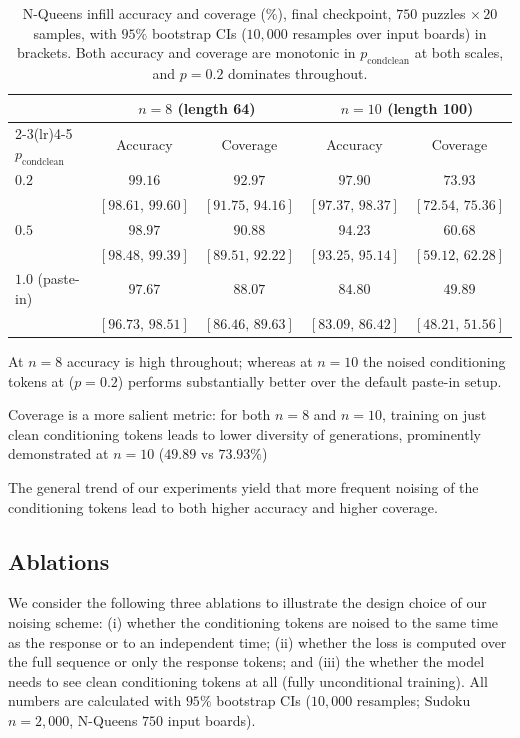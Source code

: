 \documentclass{article}
\begin{document}
\begin{table}[t]
\centering
\caption{N-Queens infill accuracy and coverage (\%), final checkpoint, $750$ puzzles
$\times\,20$ samples, with $95\%$ bootstrap CIs ($10{,}000$ resamples over input boards) in
brackets. Both accuracy and coverage are monotonic in $p_\text{condclean}$ at both scales, and
$p{=}0.2$ dominates throughout.}
\label{tab:nqueens}
\begin{tabular}{lcccc}
\toprule
& \multicolumn{2}{c}{$n=8$ (length 64)} & \multicolumn{2}{c}{$n=10$ (length 100)} \\
\cmidrule(lr){2-3}\cmidrule(lr){4-5}
$p_\text{condclean}$ & Accuracy & Coverage & Accuracy & Coverage \\
\midrule
$0.2$ & $\mathbf{99.16}$ & $\mathbf{92.97}$ & $\mathbf{97.90}$ & $\mathbf{73.93}$ \\
 & {\scriptsize $[98.61,\,99.60]$} & {\scriptsize $[91.75,\,94.16]$} & {\scriptsize $[97.37,\,98.37]$} & {\scriptsize $[72.54,\,75.36]$} \\
$0.5$ & $98.97$ & $90.88$ & $94.23$ & $60.68$ \\
 & {\scriptsize $[98.48,\,99.39]$} & {\scriptsize $[89.51,\,92.22]$} & {\scriptsize $[93.25,\,95.14]$} & {\scriptsize $[59.12,\,62.28]$} \\
$1.0$ (paste-in) & $97.67$ & $88.07$ & $84.80$ & $49.89$ \\
 & {\scriptsize $[96.73,\,98.51]$} & {\scriptsize $[86.46,\,89.63]$} & {\scriptsize $[83.09,\,86.42]$} & {\scriptsize $[48.21,\,51.56]$} \\
\bottomrule
\end{tabular}
\end{table}

At $n=8$ accuracy is high throughout; whereas at $n=10$ the noised conditioning 
tokens at ($p=0.2$) performs substantially better over the default paste-in setup.

Coverage is a more salient metric: for both $n=8$ and $n=10$, training on just clean conditioning 
tokens leads to lower diversity of generations, prominently demonstrated at $n=10$ ($49.89$ vs $73.93\%$)

The general trend of our experiments yield that more frequent noising of the conditioning tokens
lead to both higher accuracy and higher coverage.  

\subsection{Ablations}
\label{sec:ablations}
We consider the following three ablations to illustrate the design choice of our noising scheme:
(i) whether the conditioning tokens are noised to the same time as the response or to an independent time;
(ii) whether the loss is computed over the full sequence or only the response tokens; and (iii) the
whether the model needs to see clean conditioning tokens at all (fully unconditional training).
All numbers are calculated with $95\%$ bootstrap CIs
($10{,}000$ resamples; Sudoku $n{=}2{,}000$, N-Queens $750$ input boards).
\end{document}

